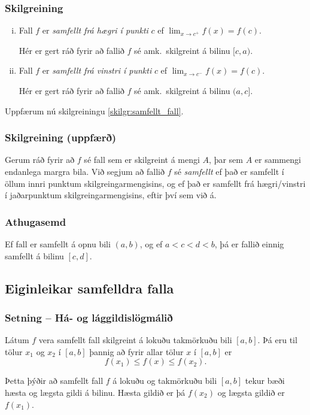 \documentclass[icelandic,a4paper,12pt]{article}
\begin{document}
\subsubsection{Skilgreining}
\begin{enumerate}[(i)]
\item Fall $f$ er \emph{samfellt frá hægri í punkti} $c$ ef
$\lim_{x\rightarrow c^+}f(x)=f(c)$.
  
Hér er gert ráð fyrir að fallið $f$ sé amk.~skilgreint á bilinu $[c, a)$.
\item Fall $f$ er \emph{samfellt frá vinstri í punkti} $c$ ef
$\lim_{x\rightarrow c^-}f(x)=f(c)$.
  
Hér er gert ráð fyrir að fallið $f$ sé amk.~skilgreint á bilinu $(a, c]$.
\end{enumerate}

Uppfærum nú skilgreiningu \ref{skilgr:samfellt_fall}.
 \subsubsection{Skilgreining (uppfærð)}
 Gerum ráð fyrir að $f$ sé fall sem er skilgreint á
 mengi $A$, þar sem $A$ er sammengi endanlega margra bila.
 Við segjum að fallið $f$ sé \emph{samfellt} ef það er samfellt í 
 öllum innri punktum skilgreingarmengisins, og ef það er samfellt
 frá hægri/vinstri í jaðarpunktum skilgreingarmengisins,
 eftir því sem við á.

\pause
\subsubsection{Athugasemd}
Ef fall er samfellt á opnu bili $(a,b)$, og ef $a<c<d<b$, þá er fallið einnig samfellt á bilinu $[c,d]$.

\subsection{Eiginleikar samfelldra falla}
\subsubsection{Setning -- Há- og lággildislögmálið}
Látum $f$ vera samfellt fall skilgreint á lokuðu takmörkuðu bili
$[a,b]$.  Þá eru til tölur $x_1$ og $x_2$ í $[a,b]$ þannig að 
fyrir allar tölur $x$ í $[a,b]$ er $$f(x_1)\leq f(x)\leq f(x_2).$$

Þetta þýðir að samfellt fall $f$ á lokuðu og takmörkuðu
bili $[a,b]$ tekur bæði hæsta og lægsta gildi á bilinu. \pause
Hæsta
gildið er þá $f(x_2)$ og lægsta gildið er $f(x_1)$.
 
\end{document}
